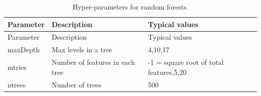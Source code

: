 \documentclass[11pt]{book}
\theoremstyle{definition}
\theoremstyle{definition}
\theoremstyle{definition}
\theoremstyle{remark}
\begin{document}
\begin{longtable}[]{@{}lll@{}}
\caption{\label{tab:randomForestParameters} Hyper-parameters for random
forests.}\tabularnewline
\toprule
\begin{minipage}[b]{0.13\columnwidth}\raggedright\strut
Parameter\strut
\end{minipage} & \begin{minipage}[b]{0.16\columnwidth}\raggedright\strut
Description\strut
\end{minipage} & \begin{minipage}[b]{0.20\columnwidth}\raggedright\strut
Typical values\strut
\end{minipage}\tabularnewline
\midrule
\endfirsthead
\toprule
\begin{minipage}[b]{0.13\columnwidth}\raggedright\strut
Parameter\strut
\end{minipage} & \begin{minipage}[b]{0.16\columnwidth}\raggedright\strut
Description\strut
\end{minipage} & \begin{minipage}[b]{0.20\columnwidth}\raggedright\strut
Typical values\strut
\end{minipage}\tabularnewline
\midrule
\endhead
\begin{minipage}[t]{0.13\columnwidth}\raggedright\strut
maxDepth\strut
\end{minipage} & \begin{minipage}[t]{0.16\columnwidth}\raggedright\strut
Max levels in a tree\strut
\end{minipage} & \begin{minipage}[t]{0.20\columnwidth}\raggedright\strut
4,10,17\strut
\end{minipage}\tabularnewline
\begin{minipage}[t]{0.13\columnwidth}\raggedright\strut
mtries\strut
\end{minipage} & \begin{minipage}[t]{0.16\columnwidth}\raggedright\strut
Number of features in each tree\strut
\end{minipage} & \begin{minipage}[t]{0.20\columnwidth}\raggedright\strut
-1 = square root of total features,5,20\strut
\end{minipage}\tabularnewline
\begin{minipage}[t]{0.13\columnwidth}\raggedright\strut
ntrees\strut
\end{minipage} & \begin{minipage}[t]{0.16\columnwidth}\raggedright\strut
Number of trees\strut
\end{minipage} & \begin{minipage}[t]{0.20\columnwidth}\raggedright\strut
500\strut
\end{minipage}\tabularnewline
\bottomrule
\end{longtable}
\end{document}

